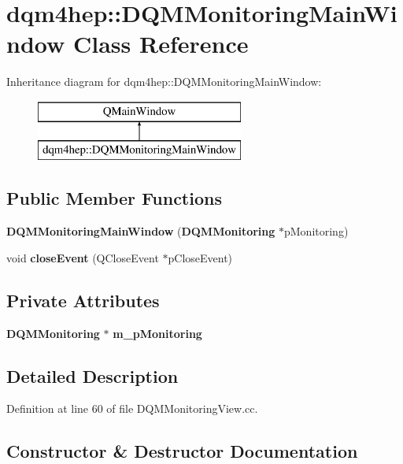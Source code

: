 \section{dqm4hep\+:\+:D\+Q\+M\+Monitoring\+Main\+Window Class Reference}
\label{classdqm4hep_1_1DQMMonitoringMainWindow}
Inheritance diagram for dqm4hep\+:\+:D\+Q\+M\+Monitoring\+Main\+Window\+:\begin{figure}[H]
\begin{center}
\leavevmode
\includegraphics[height=2.000000cm]{classdqm4hep_1_1DQMMonitoringMainWindow}
\end{center}
\end{figure}
\subsection*{Public Member Functions}
\begin{DoxyCompactItemize}
\item 
{\bf D\+Q\+M\+Monitoring\+Main\+Window} ({\bf D\+Q\+M\+Monitoring} $\ast$p\+Monitoring)
\item 
void {\bf close\+Event} (Q\+Close\+Event $\ast$p\+Close\+Event)
\end{DoxyCompactItemize}
\subsection*{Private Attributes}
\begin{DoxyCompactItemize}
\item 
{\bf D\+Q\+M\+Monitoring} $\ast$ {\bf m\+\_\+p\+Monitoring}
\end{DoxyCompactItemize}


\subsection{Detailed Description}


Definition at line 60 of file D\+Q\+M\+Monitoring\+View.\+cc.



\subsection{Constructor \& Destructor Documentation}
